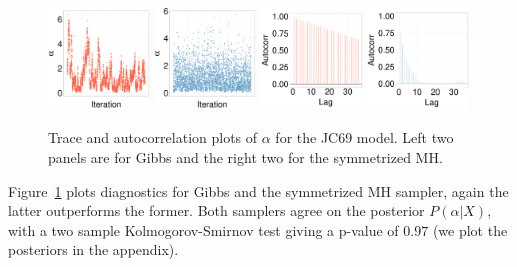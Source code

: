   \begin{figure}[H]
  \centering

  \begin{minipage}[!hp]{0.99\linewidth}
  	\centering
    \includegraphics [width=0.24\textwidth, angle=0]{figs/JC_ks/jc_traceGBS_44_05_3_.pdf}
    \includegraphics [width=0.24\textwidth, angle=0]{figs/JC_ks/jc_traceMH_44_05_3_.pdf}
    \includegraphics [width=0.24\textwidth, angle=0]{figs/JC_ks/jc_gbsacf_44_05_3_.pdf}
    \includegraphics [width=0.24\textwidth, angle=0]{figs/JC_ks/jc_mhacf_44_05_3_.pdf}
  \end{minipage}
    \caption{Trace and autocorrelation plots of $\alpha$ for the JC69 model. Left two panels are for Gibbs and the right two for the symmetrized MH.}
    \label{fig:ACC_JC_m}
  \end{figure}
  Figure~\ref{fig:ACC_JC_m} plots diagnostics for Gibbs and the symmetrized MH sampler, again the latter outperforms the former. 
  Both samplers agree on the posterior $P(\alpha|X)$, with a
  two sample Kolmogorov-Smirnov test giving a p-value of $0.97$ (we plot the posteriors in the appendix). 


